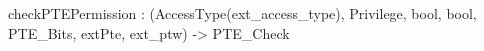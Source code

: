 checkPTEPermission : (AccessType(ext_access_type), Privilege, bool, bool, PTE_Bits, extPte, ext_ptw) -> PTE_Check